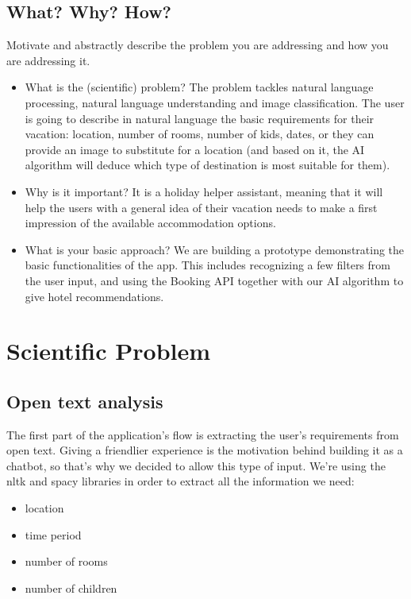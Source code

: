 \documentclass[runningheads,a4paper,11pt]{report}
\begin{document}
\section{What? Why? How?}
\label{section:what}

Motivate and abstractly describe the problem you are addressing and how you are addressing it. 
\begin{itemize}
	\item What is the (scientific) problem? 
	\newline
	The problem tackles natural language processing, natural language understanding and image classification. The user is going to describe in natural language the basic requirements for their vacation: location, number of rooms, number of kids, dates, or they can provide an image to substitute for a location (and based on it, the AI algorithm will deduce which type of destination is most suitable for them).
	\item Why is it important? 
	\newline
	It is a holiday helper assistant, meaning that it will help the users with a general idea of their vacation needs to make a first impression of the available accommodation options.
	\item What is your basic approach? 
	\newline
	We are building a prototype demonstrating the basic functionalities of the app. This includes recognizing a few filters from the user input, and using the Booking API together with our AI algorithm to give hotel recommendations.
\end{itemize}


\chapter{Scientific Problem}
\label{section:scientificProblem}

\section{Open text analysis}
\label{section:openTextAnalysis}
The first part of the application's flow is extracting the user's requirements from open text. Giving a friendlier experience is the motivation behind building it as a chatbot, so that's why we decided to allow this type of input. We're using the nltk and spacy libraries in order to extract all the information we need:
\begin{itemize}
	\item location
	\item time period
	\item number of rooms
	\item number of children
\end{itemize}  
\end{document}
